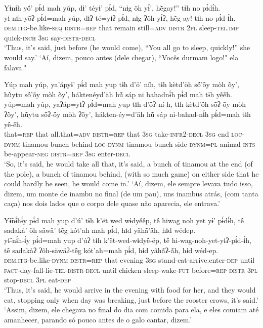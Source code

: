 \documentclass[output=paper,
modfonts,nonflat
]{langsci/langscibook}
\begin{document}
\ea  Yɨnɨh yö́’ pɨ́d mah yúp, dɨ’ téyɨ’ pɨ́d, “nɨg õh yɨ́’, hẽ̀gay!” tɨh no pɨ́dɨ́h.\\ 
\gll yɨ-nɨh-yö́ʔ pɨ́d=mah yúp, dɨʔ té=yɨʔ pɨ́d, nɨg ʔõh-yɨ́ʔ, hẽ̀g-ay! tɨh no-pɨ́d-ɨ́h.\\
     \textsc{dem.itg-}be.like\textsc{-seq} \textsc{distr=rep} that remain still\textsc{=adv} \textsc{distr} \textsc{2pl} sleep\textsc{-tel.imp} quick\textsc{-inch} \textsc{3sg} say\textsc{-distr-decl}\\
\glt ‘Thus, it’s said, just before (he would come), “You all go to sleep, quickly!” she would say.'
\glt ‘Aí, dizem, pouco antes (dele chegar), “Vocês durmam logo!" ela falava."
\z 

\newpage
\ea  Yúp mah yúp, ya’ápyɨ’ pɨ́d mah yup tɨh d’ö’ níh, tɨh kètd’öh sö́’ö́y mòh õ̀y’, hũ̀ytu sö́’ö́y mòh õ̀y’, háktenéyd’äh hṹ sáp ni bahadnɨ́h pɨ́d mah tɨh yë́ë́h.\\ 
\gll yúp=mah yúp, yaʔáp=yɨʔ pɨ́d=mah yup tɨh d’öʔ-ní-h, tɨh kètd’öh sö́ʔ-ö́y mòh ʔõ̀y’, hũ̀ytu sö́ʔ-ö́y mòh ʔõ̀y’, hákten-éy=d’äh hṹ sáp ni-bahad-nɨ́h pɨ́d=mah tɨh yë́-ë́h.\\
     that\textsc{=rep} that all.that\textsc{=adv} \textsc{distr=rep} that \textsc{3sg} take\textsc{-infr2-decl} \textsc{3sg} end \textsc{loc-dynm} tinamou bunch behind \textsc{loc-dynm} tinamou bunch side\textsc{-dynm=pl} animal \textsc{ints} be-appear\textsc{-neg} \textsc{distr=rep} \textsc{3sg} enter\textsc{-decl}\\
\glt ‘So, it’s said, he would take all that, it’s said, a bunch of tinamou at the end (of the pole), a bunch of tinamou behind, (with so much game) on either side that he could hardly be seen, he would come in.'
\glt ‘Aí, dizem, ele sempre levava tudo isso, dizem, um monte de inambu no final (de um pau), uns inambus atrás, (com tanta caça) nos dois lados que o corpo dele quase não aparecia, ele entrava.'
\z 

\ea  Yɨ̃nɨ́hɨ́y pɨ́d mah yup d’ú’ tɨh k’ët wed wɨdyë́ë́p, të́ hiwag noh yet yɨ’ pɨ́dɨ́h, të́ sadakà’ õh säwä’ të́g kót’ah mah pɨ́d, hɨd yãhã́’ã́h, hɨd wédep.\\ 
\gll yɨ̃-nɨ́h-ɨ́y pɨ́d=mah yup d’úʔ tɨh k’ët-wed-wɨdyë́-ëp, të́ hi-wag-noh-yet-yɨʔ-pɨ́d-ɨ́h, të́ sadakàʔ ʔõh-säwäʔ-të́g kót’ah=mah pɨ́d, hɨd yãhã́ʔ-ã́h, hɨd wéd-ep.\\
     \textsc{dem.itg-}be.like\textsc{-dynm} \textsc{distr=rep} that evening \textsc{3sg} stand-eat-arrive.enter\textsc{-dep} until \textsc{fact}-day-fall-lie\textsc{-tel-distr-decl} until chicken sleep-wake\textsc{-fut} before\textsc{=rep} \textsc{distr} \textsc{3pl} stop\textsc{-decl} \textsc{3pl} eat\textsc{-dep}\\
\glt ‘Thus, it’s said, he would arrive in the evening with food for her, and they would eat, stopping only when day was breaking, just before the rooster crows, it’s said.'
\glt ‘Assim, dizem, ele chegava no final do dia com comida para ela, e eles comiam até amanhecer, parando só pouco antes de o galo cantar, dizem.'
\z 
\end{document}

